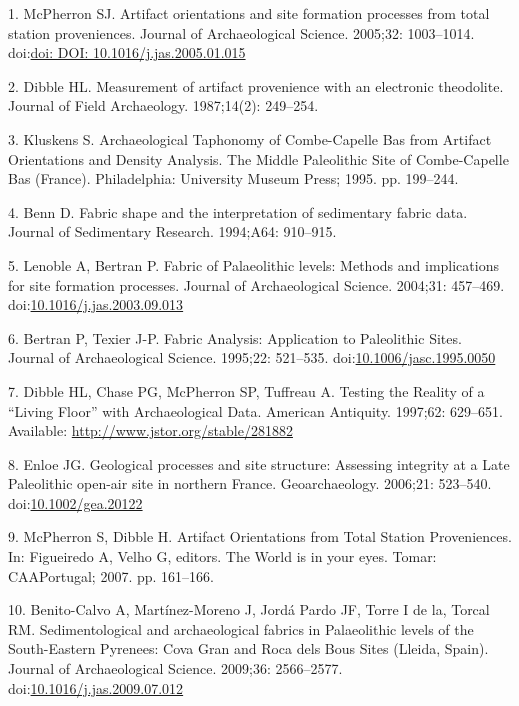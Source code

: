 \documentclass[]{article}
\begin{document}
\hypertarget{refs}{}
\hypertarget{ref-mcpherron_artifact_2005}{}
1. McPherron SJ. Artifact orientations and site formation processes from
total station proveniences. Journal of Archaeological Science. 2005;32:
1003--1014.
doi:\href{https://doi.org/doi:\%20DOI:\%2010.1016/j.jas.2005.01.015}{doi: DOI: 10.1016/j.jas.2005.01.015}

\hypertarget{ref-dibble_measurement_1987}{}
2. Dibble HL. Measurement of artifact provenience with an electronic
theodolite. Journal of Field Archaeology. 1987;14(2): 249--254.

\hypertarget{ref-kluskens_archaeological_1995}{}
3. Kluskens S. Archaeological Taphonomy of Combe-Capelle Bas from
Artifact Orientations and Density Analysis. The Middle Paleolithic Site
of Combe-Capelle Bas (France). Philadelphia: University Museum Press;
1995. pp. 199--244.

\hypertarget{ref-benn_fabric_1994}{}
4. Benn D. Fabric shape and the interpretation of sedimentary fabric
data. Journal of Sedimentary Research. 1994;A64: 910--915.

\hypertarget{ref-lenoble_fabric_2004}{}
5. Lenoble A, Bertran P. Fabric of Palaeolithic levels: Methods and
implications for site formation processes. Journal of Archaeological
Science. 2004;31: 457--469.
doi:\href{https://doi.org/10.1016/j.jas.2003.09.013}{10.1016/j.jas.2003.09.013}

\hypertarget{ref-bertran_fabric_1995}{}
6. Bertran P, Texier J-P. Fabric Analysis: Application to Paleolithic
Sites. Journal of Archaeological Science. 1995;22: 521--535.
doi:\href{https://doi.org/10.1006/jasc.1995.0050}{10.1006/jasc.1995.0050}

\hypertarget{ref-dibble_testing_1997}{}
7. Dibble HL, Chase PG, McPherron SP, Tuffreau A. Testing the Reality of
a ``Living Floor'' with Archaeological Data. American Antiquity.
1997;62: 629--651. Available: \url{http://www.jstor.org/stable/281882}

\hypertarget{ref-enloe_geological_2006}{}
8. Enloe JG. Geological processes and site structure: Assessing
integrity at a Late Paleolithic open-air site in northern France.
Geoarchaeology. 2006;21: 523--540.
doi:\href{https://doi.org/10.1002/gea.20122}{10.1002/gea.20122}

\hypertarget{ref-figueiredo_artifact_2007}{}
9. McPherron S, Dibble H. Artifact Orientations from Total Station
Proveniences. In: Figueiredo A, Velho G, editors. The World is in your
eyes. Tomar: CAAPortugal; 2007. pp. 161--166.

\hypertarget{ref-benito-calvo_sedimentological_2009}{}
10. Benito-Calvo A, Martínez-Moreno J, Jordá Pardo JF, Torre I de la,
Torcal RM. Sedimentological and archaeological fabrics in Palaeolithic
levels of the South-Eastern Pyrenees: Cova Gran and Roca dels Bous Sites
(Lleida, Spain). Journal of Archaeological Science. 2009;36: 2566--2577.
doi:\href{https://doi.org/10.1016/j.jas.2009.07.012}{10.1016/j.jas.2009.07.012}
\end{document}
